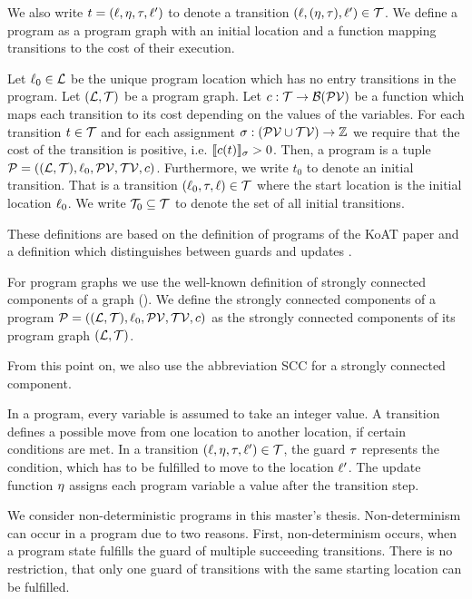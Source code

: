 We also write $t = (\ell, \eta, \tau, \ell')$ to denote a transition $(\ell, (\eta, \tau), \ell') \in \mathcal{T}$.
We define a program as a program graph with an initial location and a function mapping transitions to the cost of their execution.

\begin{definition}[Program] 
  Let $\ell_0 \in \mathcal{L}$ be the unique program location which has no entry transitions in the program.
  Let $(\mathcal{L}, \mathcal{T})$ be a program graph.
  Let $c: \mathcal{T} \rightarrow \mathcal{B}(\mathcal{PV})$ be a function which maps each transition to its cost depending on the values of the variables.
  For each transition $t \in \mathcal{T}$ and for each assignment $\sigma: (\mathcal{PV} \cup \mathcal{TV}) \rightarrow \mathbb{Z}$ we require that the cost of the transition is positive, i.e. $\llbracket c(t) \rrbracket_{\sigma} > 0$.
  Then, a program is a tuple $\mathcal{P} = ((\mathcal{L}, \mathcal{T}), \ell_0, \mathcal{PV}, \mathcal{TV}, c)$.
  Furthermore, we write $t_0$ to denote an initial transition.
  That is a transition $(\ell_0, \tau, \ell) \in \mathcal{T}$ where the start location is the initial location $\ell_0$.
  We write $\mathcal{T}_0 \subseteq \mathcal{T}$ to denote the set of all initial transitions.
\end{definition}

These definitions are based on the definition of programs of the KoAT paper \cite{koat} and a definition which distinguishes between guards and updates \cite{lowerruntime}.

For program graphs we use the well-known definition of strongly connected components of a graph (\cite{sccs}).
We define the strongly connected components of a program $\mathcal{P} = ((\mathcal{L}, \mathcal{T}), \ell_0, \mathcal{PV}, \mathcal{TV}, c)$ as the strongly connected components of its program graph $(\mathcal{L}, \mathcal{T})$.

From this point on, we also use the abbreviation SCC for a strongly connected component.

In a program, every variable is assumed to take an integer value.
A transition defines a possible move from one location to another location, if certain conditions are met.
In a transition $(\ell,\eta,\tau,\ell') \in \mathcal{T}$, the guard $\tau$ represents the condition, which has to be fulfilled to move to the location $\ell'$.
The update function $\eta$ assigns each program variable a value after the transition step.

We consider non-deterministic programs in this master's thesis.
Non-determinism can occur in a program due to two reasons.
First, non-determinism occurs, when a program state fulfills the guard of multiple succeeding transitions. 
There is no restriction, that only one guard of transitions with the same starting location can be fulfilled.

